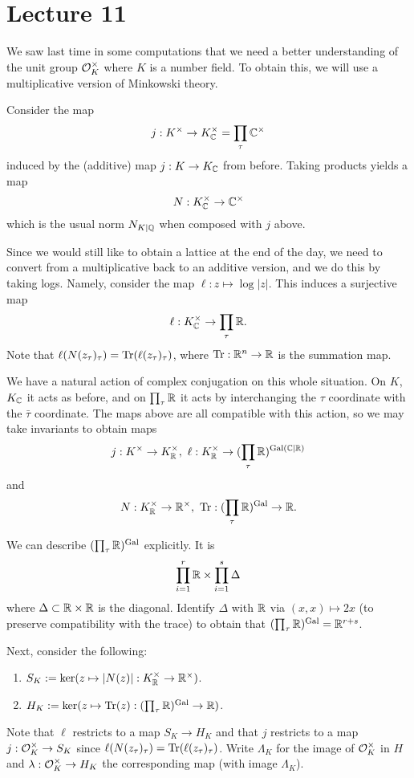 \section{Lecture 11}

We saw last time in some computations that we need a better understanding of the unit group $\mathcal{O}_{K}^{\times}$ where $K$ is a number field.
To obtain this, we will use a multiplicative version of Minkowski theory.

Consider the map
\[ j : K^{\times} \to K_{\mathbb{C}}^{\times} = \prod_{\tau} \mathbb{C}^{\times} \]
induced by the (additive) map $j : K \to K_{\mathbb{C}}$ from before.
Taking products yields a map
\[ N : K_{\mathbb{C}}^{\times} \to \mathbb{C}^{\times} \]
which is the usual norm $N_{K|\mathbb{Q}}$ when composed with $j$ above.

Since we would still like to obtain a lattice at the end of the day, we need to convert from a multiplicative back to an additive version, and we do this by taking logs.
Namely, consider the map $\ell : z \mapsto \log|z|$.
This induces a surjective map
\[ \ell : K_{\mathbb{C}}^{\times} \to \prod_{\tau} \mathbb{R}. \]
Note that $\ell(N(z_{\tau})_{\tau}) = \operatorname{Tr}(\ell(z_{\tau})_{\tau})$, where $\operatorname{Tr} : \mathbb{R}^{n} \to \mathbb{R}$ is the summation map.

We have a natural action of complex conjugation on this whole situation.
On $K$, $K_{\mathbb{C}}$ it acts as before, and on $\prod_{\tau} \mathbb{R}$ it acts by interchanging the $\tau$ coordinate with the $\bar\tau$ coordinate.
The maps above are all compatible with this action, so we may take invariants to obtain maps
\[ j : K^{\times} \to K_{\mathbb{R}}^{\times}, \ \ell : K_{\mathbb{R}}^{\times} \to (\prod_{\tau} \mathbb{R})^{\operatorname{Gal}(\mathbb{C}|\mathbb{R})} \]
and
\[ N : K_{\mathbb{R}}^{\times} \to \mathbb{R}^{\times}, \ \operatorname{Tr} : (\prod_{\tau} \mathbb{R})^{\operatorname{Gal}} \to \mathbb{R}. \]

We can describe $(\prod_{\tau} \mathbb{R})^{\operatorname{Gal}}$ explicitly.
It is
\[ \prod_{i = 1}^{r} \mathbb{R} \times \prod_{i = 1}^{s} \Delta \]
where $\Delta \subset \mathbb{R} \times \mathbb{R}$ is the diagonal.
Identify $\Delta$ with $\mathbb{R}$ via $(x,x) \mapsto 2x$ (to preserve compatibility with the trace) to obtain that $(\prod_{\tau} \mathbb{R})^{\operatorname{Gal}} = \mathbb{R}^{r + s}$.

Next, consider the following:
\begin{enumerate}
  \item $S_{K} := \ker(z \mapsto |N(z)| : K_{\mathbb{R}}^{\times} \to \mathbb{R}^{\times})$.
  \item $H_{K} := \ker(z \mapsto \operatorname{Tr}(z) : (\prod_{\tau} \mathbb{R})^{\operatorname{Gal}} \to \mathbb{R})$.
\end{enumerate}
Note that $\ell$ restricts to a map $S_{K} \to H_{K}$ and that $j$ restricts to a map $j : \mathcal{O}_{K}^{\times} \to S_{K}$ since $\ell(N(z_{\tau})_{\tau}) = \operatorname{Tr}(\ell(z_{\tau})_{\tau})$.
Write $\Lambda_{K}$ for the image of $\mathcal{O}_{K}^{\times}$ in $H$ and $\lambda : \mathcal{O}_{K}^{\times} \to H_{K}$ the corresponding map (with image $\Lambda_{K}$).

